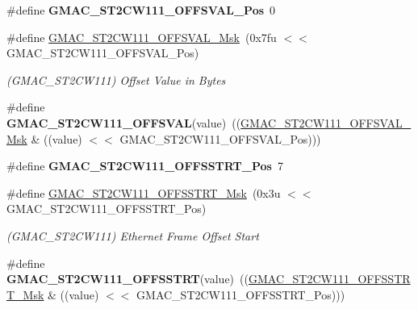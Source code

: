 \begin{DoxyCompactItemize}
\item 
\mbox{\label{group__SAME70__GMAC_gaa049f96a1bd2fa90e5c1c99a5b4ebc62}} 
\#define {\bfseries G\+M\+A\+C\+\_\+\+S\+T2\+C\+W111\+\_\+\+O\+F\+F\+S\+V\+A\+L\+\_\+\+Pos}~0
\item 
\mbox{\label{group__SAME70__GMAC_ga04fe965ef64cc8f205fad52f8ce64827}} 
\#define \mbox{\hyperlink{group__SAME70__GMAC_ga04fe965ef64cc8f205fad52f8ce64827}{G\+M\+A\+C\+\_\+\+S\+T2\+C\+W111\+\_\+\+O\+F\+F\+S\+V\+A\+L\+\_\+\+Msk}}~(0x7fu $<$$<$ G\+M\+A\+C\+\_\+\+S\+T2\+C\+W111\+\_\+\+O\+F\+F\+S\+V\+A\+L\+\_\+\+Pos)
\begin{DoxyCompactList}\small\item\em (G\+M\+A\+C\+\_\+\+S\+T2\+C\+W111) Offset Value in Bytes \end{DoxyCompactList}\item 
\mbox{\label{group__SAME70__GMAC_ga8b93488277214f4c706450c0615c9cf3}} 
\#define {\bfseries G\+M\+A\+C\+\_\+\+S\+T2\+C\+W111\+\_\+\+O\+F\+F\+S\+V\+AL}(value)~((\mbox{\hyperlink{group__SAMV71__GMAC_ga04fe965ef64cc8f205fad52f8ce64827}{G\+M\+A\+C\+\_\+\+S\+T2\+C\+W111\+\_\+\+O\+F\+F\+S\+V\+A\+L\+\_\+\+Msk}} \& ((value) $<$$<$ G\+M\+A\+C\+\_\+\+S\+T2\+C\+W111\+\_\+\+O\+F\+F\+S\+V\+A\+L\+\_\+\+Pos)))
\item 
\mbox{\label{group__SAME70__GMAC_ga732f39d933d1f523e1a739ffe994c421}} 
\#define {\bfseries G\+M\+A\+C\+\_\+\+S\+T2\+C\+W111\+\_\+\+O\+F\+F\+S\+S\+T\+R\+T\+\_\+\+Pos}~7
\item 
\mbox{\label{group__SAME70__GMAC_ga5f71093eb8dd8583a2dad043a22f8143}} 
\#define \mbox{\hyperlink{group__SAME70__GMAC_ga5f71093eb8dd8583a2dad043a22f8143}{G\+M\+A\+C\+\_\+\+S\+T2\+C\+W111\+\_\+\+O\+F\+F\+S\+S\+T\+R\+T\+\_\+\+Msk}}~(0x3u $<$$<$ G\+M\+A\+C\+\_\+\+S\+T2\+C\+W111\+\_\+\+O\+F\+F\+S\+S\+T\+R\+T\+\_\+\+Pos)
\begin{DoxyCompactList}\small\item\em (G\+M\+A\+C\+\_\+\+S\+T2\+C\+W111) Ethernet Frame Offset Start \end{DoxyCompactList}\item 
\mbox{\label{group__SAME70__GMAC_ga6ce78628ad9ba6feff8668e22042d2c4}} 
\#define {\bfseries G\+M\+A\+C\+\_\+\+S\+T2\+C\+W111\+\_\+\+O\+F\+F\+S\+S\+T\+RT}(value)~((\mbox{\hyperlink{group__SAMV71__GMAC_ga5f71093eb8dd8583a2dad043a22f8143}{G\+M\+A\+C\+\_\+\+S\+T2\+C\+W111\+\_\+\+O\+F\+F\+S\+S\+T\+R\+T\+\_\+\+Msk}} \& ((value) $<$$<$ G\+M\+A\+C\+\_\+\+S\+T2\+C\+W111\+\_\+\+O\+F\+F\+S\+S\+T\+R\+T\+\_\+\+Pos)))

\end{DoxyCompactItemize}
